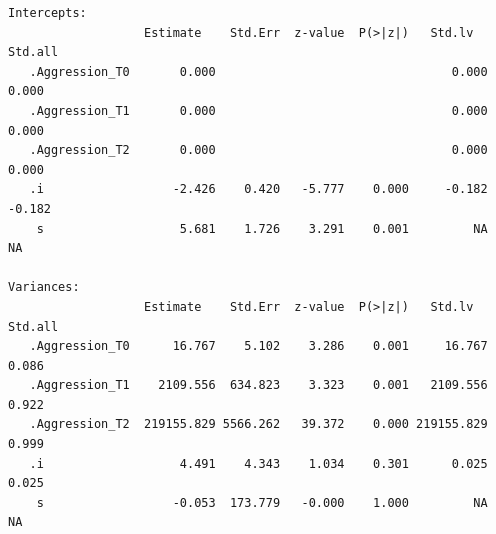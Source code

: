 \documentclass{article}
\begin{document}
\begin{verbatim}
Intercepts:
                   Estimate    Std.Err  z-value  P(>|z|)   Std.lv    Std.all
   .Aggression_T0       0.000                                 0.000    0.000
   .Aggression_T1       0.000                                 0.000    0.000
   .Aggression_T2       0.000                                 0.000    0.000
   .i                  -2.426    0.420   -5.777    0.000     -0.182   -0.182
    s                   5.681    1.726    3.291    0.001         NA       NA

Variances:
                   Estimate    Std.Err  z-value  P(>|z|)   Std.lv    Std.all
   .Aggression_T0      16.767    5.102    3.286    0.001     16.767    0.086
   .Aggression_T1    2109.556  634.823    3.323    0.001   2109.556    0.922
   .Aggression_T2  219155.829 5566.262   39.372    0.000 219155.829    0.999
   .i                   4.491    4.343    1.034    0.301      0.025    0.025
    s                  -0.053  173.779   -0.000    1.000         NA       NA
\end{verbatim}
\end{document}

